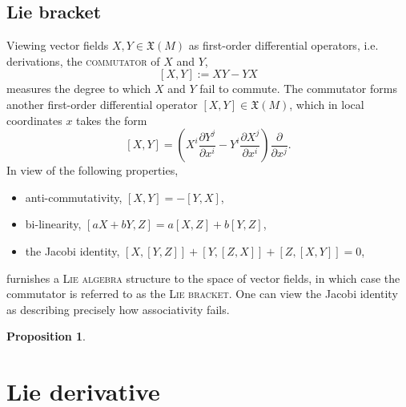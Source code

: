 \documentclass[reqno]{amsart}
\newtheorem{proposition}[theorem]{Proposition}
\theoremstyle{definition}
\theoremstyle{remark}
\renewcommand{\emph}{\textsc}
\begin{document}
\subsection{Lie bracket}

Viewing vector fields $X, Y \in \mathfrak X (M)$ as first-order differential operators, i.e. derivations, the \emph{commutator}  of $X$ and $Y$, 
	\[ [X, Y] := XY - YX \]
measures the degree to which $X$ and $Y$ fail to commute. The commutator forms another first-order differential operator $[X, Y] \in \mathfrak X (M)$, which in local coordinates $x$ takes the form
		\[ [X, Y] = \left( X^i \frac{\partial Y^j}{\partial x^i} - Y^i \frac{\partial X^j}{\partial x^i}\right) \frac{\partial}{\partial x^j} .\]
In view of the following properties, 
\begin{itemize}
	\item anti-commutativity, $[X, Y] = - [Y, X]$,
	\item bi-linearity, $[a X + bY, Z] = a[X, Z] + b [Y, Z]$,
	\item the Jacobi identity, $[X, [Y, Z]] + [Y, [Z, X]] + [Z, [X, Y]] = 0$,
\end{itemize}
furnishes a \emph{Lie algebra} structure to the space of vector fields, in which case the commutator is referred to as the \emph{Lie bracket}. One can view the Jacobi identity as describing precisely how associativity fails. 

\begin{proposition}
	
\end{proposition}

\section{Lie derivative}
\end{document}
